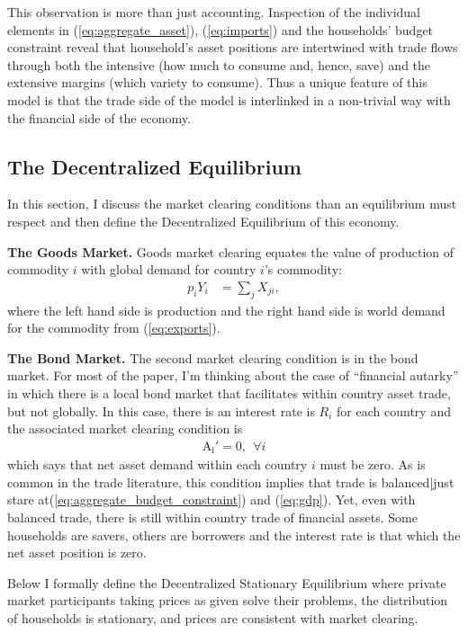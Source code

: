 \documentclass[12pt,pdftex]{article}
\begin{document}
\begin{onehalfspacing}
This observation is more than just accounting. Inspection of the individual elements in (\ref{eq:aggregate_asset}), (\ref{eq:imports}) and the households' budget constraint reveal that household's asset positions are intertwined with trade flows through both the intensive (how much to consume and, hence, save) and the extensive margins (which variety to consume). Thus a unique feature of this model is that the trade side of the model is interlinked in a non-trivial way with the financial side of the economy.

\subsection{The Decentralized Equilibrium}

In this section, I discuss the market clearing conditions than an equilibrium must respect and then define the Decentralized Equilibrium of this economy.

\textbf{The Goods Market.} Goods market clearing equates the value of production of commodity $i$  with global demand for country $i$'s commodity:
\begin{align}
p_{i} Y_{i} &= \sum_{j}  X_{ji} \label{eq:goods-supply},
\end{align}
where the left hand side is production and the right hand side is world demand for the commodity from (\ref{eq:exports}).

\textbf{The Bond Market.} The second market clearing condition is in the bond market. For most of the paper, I'm thinking about the case of ``financial autarky'' in which there is a local bond market that facilitates within country asset trade, but not globally. In this case, there is an interest rate is $R_i$ for each country and the associated market clearing condition is
\begin{align}
\mathrm{A_i'} = 0, \ \ \forall i
\label{eq:bond-market-country}
\end{align}
which says that net asset demand within each country $i$ must be zero. As is common in the trade literature, this condition implies that trade is balanced|just stare at(\ref{eq:aggregate_budget_constraint}) and (\ref{eq:gdp}). Yet, even with balanced trade, there is still within country trade of financial assets. Some households are savers, others are borrowers and the interest rate is that which the net asset position is zero.

Below I formally define the Decentralized Stationary Equilibrium where private market participants taking prices as given solve their problems, the distribution of households is stationary, and prices are consistent with market clearing.


\end{onehalfspacing}
\end{document}
